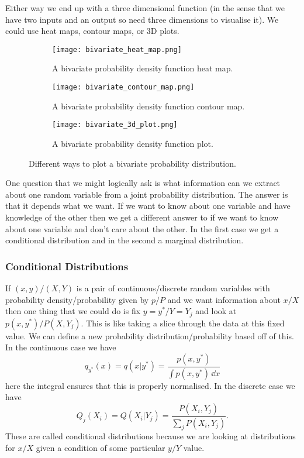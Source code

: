     Either way we end up with a three dimensional function (in the sense that we have two inputs and an output so need three dimensions to visualise it).
    We could use heat maps, contour maps, or 3D plots.
    \begin{figure}[ht]
        \centering
        \begin{subfigure}{0.35\textwidth}
            \centering
            \texttt{[image: bivariate\_heat\_map.png]}
            \caption{A bivariate probability density function heat map.}
            \label{fig:bivariate heat map}
        \end{subfigure}
        \begin{subfigure}{0.35\textwidth}
            \centering
            \texttt{[image: bivariate\_contour\_map.png]}
            \caption{A bivariate probability density function contour map.}
        \end{subfigure}
        \begin{subfigure}{0.35\textwidth}
            \centering
            \texttt{[image: bivariate\_3d\_plot.png]}
            \caption{A bivariate probability density function plot.}
        \end{subfigure}
        \caption{Different ways to plot a bivariate probability distribution.}
    \end{figure}
    One question that we might logically ask is what information can we extract about one random variable from a joint probability distribution.
    The answer is that it depends what we want.
    If we want to know about one variable and have knowledge of the other then we get a different answer to if we want to know about one variable and don't care about the other.
    In the first case we get a conditional distribution and in the second a marginal distribution.
    
    \subsubsection{Conditional Distributions}
    If \((x, y)/(X, Y)\) is a pair of continuous/discrete random variables with probability density/probability given by \(p/P\) and we want information about \(x/X\) then one thing that we could do is fix \(y=y^*/Y=Y_j\) and look at \(p(x, y^*)/P(X, Y_j)\).
    This is like taking a slice through the data at this fixed value.
    We can define a new probability distribution/probability based off of this.
    In the continuous case we have
    \[q_{y^*}(x) = q(x|y^*) = \frac{p(x, y^*)}{\int p(x, y^*)\,\dd{x}}\]
    here the integral ensures that this is properly normalised.
    In the discrete case we have
    \[Q_j(X_i) = Q(X_i|Y_j) = \frac{P(X_i, Y_j)}{\sum_{j}P(X_i, Y_j)}.\]
    These are called conditional distributions because we are looking at distributions for \(x/X\) given a condition of some particular \(y/Y\) value.
    
